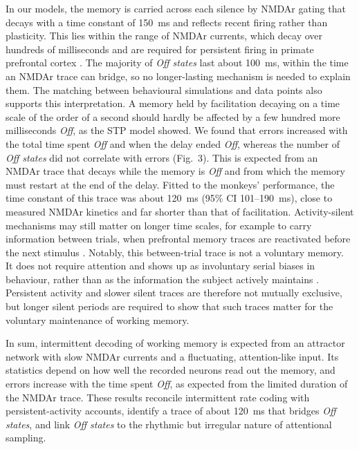 \documentclass[11pt]{article}
\begin{document}
In our models, the memory is carried across each silence by NMDAr gating that decays with a time constant of 150~ms and reflects recent firing rather than plasticity. This lies within the range of NMDAr currents, which decay over hundreds of milliseconds \citep{vicini1998,wangh2008} and are required for persistent firing in primate prefrontal cortex \citep{wangm2013}. The majority of \emph{Off states} last about 100~ms, within the time an NMDAr trace can bridge, so no longer-lasting mechanism is needed to explain them. The matching between behavioural simulations and data points also supports this interpretation. A memory held by facilitation decaying on a time scale of the order of a second should hardly be affected by a few hundred more milliseconds \emph{Off}, as the STP model showed. We found that errors increased with the total time spent \emph{Off} and when the delay ended \emph{Off}, whereas the number of \emph{Off states} did not correlate with errors (Fig.~3). This is expected from an NMDAr trace that decays while the memory is \emph{Off} and from which the memory must restart at the end of the delay. Fitted to the monkeys' performance, the time constant of this trace was about 120~ms (95\% CI 101--190~ms), close to measured NMDAr kinetics and far shorter than that of facilitation. Activity-silent mechanisms may still matter on longer time scales, for example to carry information between trials, when prefrontal memory traces are reactivated before the next stimulus \citep{barbosa2020}. Notably, this between-trial trace is not a voluntary memory. It does not require attention and shows up as involuntary serial biases in behaviour, rather than as the information the subject actively maintains \citep{kiyonaga2017,pascucci2023}. Persistent activity and slower silent traces are therefore not mutually exclusive, but longer silent periods are required to show that such traces matter for the voluntary maintenance of working memory.

In sum, intermittent decoding of working memory is expected from an attractor network with slow NMDAr currents and a fluctuating, attention-like input. Its statistics depend on how well the recorded neurons read out the memory, and errors increase with the time spent \emph{Off}, as expected from the limited duration of the NMDAr trace. These results reconcile intermittent rate coding with persistent-activity accounts, identify a trace of about 120~ms that bridges \emph{Off states}, and link \emph{Off states} to the rhythmic but irregular nature of attentional sampling.
\end{document}
